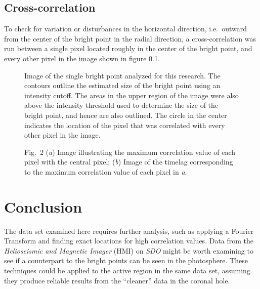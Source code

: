 \documentclass[preprint2]{aastex}
\begin{document}
\subsection{Cross-correlation}
To check for variation or disturbances in the horizontal direction, i.e.\
outward from the center of the bright point in the radial direction, a
cross-correlation was run between a single pixel located roughly in the
center of the bright point, and every other pixel in the image shown in
figure {\ref{}}.
\begin{figure}[!htb]
    \caption{Image of the single bright point analyzed for this research.
        The contours outline the estimated size of the bright point
        using an intensity cutoff. The areas in the upper region of the
        image were also above the intensity threshold used to determine
        the size of the bright point, and hence are also outlined. The circle
        in the center indicates the location of the pixel that was correlated
        with every other pixel in the image.}
    \label{tt_color}
\end{figure}


\begin{figure*}[!htb]
    \caption{{\sc Fig.~2} (\emph{a}) Image illustrating the maximum correlation
        value of each pixel with the central pixel;
        (\emph{b}) Image of the timelag corresponding to the maximum correlation
        value of each pixel in \emph{a}.
       \label{cc_tt}}
\end{figure*}

\section{Conclusion}\label{conclusion}
The data set examined here requires further analysis, such as applying a
Fourier Transform and finding exact locations for high correlation values.
Data from the \emph{Helioseismic and Magnetic Imager} (HMI) on \emph{SDO} 
might be worth examining to see if a counterpart to the bright points can
be seen in the photosphere.
These techniques could be applied to the active region in the same data set,
assuming they produce reliable results from the ``cleaner'' data in the
coronal hole.
\newpage

\end{document}
